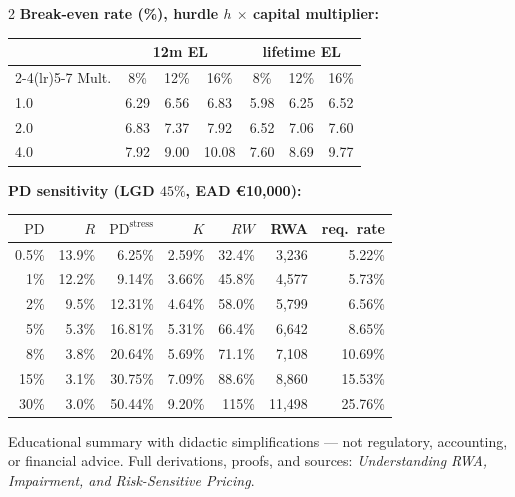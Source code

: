 \documentclass[10pt,a4paper]{report}
\renewcommand{\EUR}[1]{\euro#1}
\newcommand{\PD}{\mathrm{PD}}
\newcommand{\mini}[1]{\textbf{\small #1}}
\begin{document}
\begin{multicols}{2}
\mini{Break-even rate (\%), hurdle $h$ $\times$ capital multiplier:}
\begin{center}\small
\begin{tabular}{@{}lcccccc@{}}
\toprule
& \multicolumn{3}{c}{12m EL} & \multicolumn{3}{c}{lifetime EL}\\
\cmidrule(lr){2-4}\cmidrule(lr){5-7}
Mult. & 8\% & 12\% & 16\% & 8\% & 12\% & 16\%\\
\midrule
1.0 & 6.29 & 6.56 & 6.83 & 5.98 & 6.25 & 6.52\\
2.0 & 6.83 & 7.37 & 7.92 & 6.52 & 7.06 & 7.60\\
4.0 & 7.92 & 9.00 & 10.08 & 7.60 & 8.69 & 9.77\\
\bottomrule
\end{tabular}
\end{center}
\mini{PD sensitivity (LGD $45\%$, EAD \EUR{10{,}000}):}
\begin{center}\scriptsize
\begin{tabular}{@{}rrrrrrr@{}}
\toprule
$\PD$ & $R$ & $\PD^{\mathrm{stress}}$ & $K$ & $RW$ & RWA & req.\ rate\\
\midrule
0.5\% & 13.9\% & 6.25\% & 2.59\% & 32.4\% & 3{,}236 & 5.22\%\\
1\% & 12.2\% & 9.14\% & 3.66\% & 45.8\% & 4{,}577 & 5.73\%\\
2\% & 9.5\% & 12.31\% & 4.64\% & 58.0\% & 5{,}799 & 6.56\%\\
5\% & 5.3\% & 16.81\% & 5.31\% & 66.4\% & 6{,}642 & 8.65\%\\
8\% & 3.8\% & 20.64\% & 5.69\% & 71.1\% & 7{,}108 & 10.69\%\\
15\% & 3.1\% & 30.75\% & 7.09\% & 88.6\% & 8{,}860 & 15.53\%\\
30\% & 3.0\% & 50.44\% & 9.20\% & 115\% & 11{,}498 & 25.76\%\\
\bottomrule
\end{tabular}
\end{center}

\vfill
\begin{center}\scriptsize\color{accentgrey}
Educational summary with didactic simplifications --- not regulatory,
accounting, or financial advice. Full derivations, proofs, and
sources: \emph{Understanding RWA, Impairment, and Risk-Sensitive
Pricing}.
\end{center}

\end{multicols}
\end{document}
